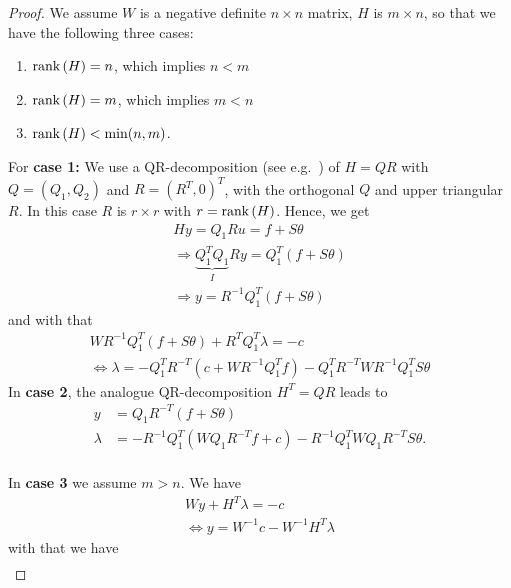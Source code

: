 \begin{proof}
We assume $W$ is a negative definite $n\times n$ matrix, $H$ is $m\times n$, so that we have the following three cases:
%
\begin{enumerate}
\item $\text{rank}\left(H\right) = n$, which implies $n<m$
\item $\text{rank}\left(H\right) = m$, which implies $m<n$
\item $\text{rank}\left(H\right) < \min(n,m)$.
\end{enumerate}
%
For {\bf{case 1:}}
%
We use a QR-decomposition (see e.g.~\cite{Golub:1996}) of $H = QR$ with $Q = (Q_1, Q_2)$ and $R = (R^T,0)^T$, with the orthogonal $Q$ and upper triangular $R$. 
%
In this case $R$ is $r\times r$ with $r=\text{rank}\left(H\right)$. 
%
Hence, we get
%
\begin{equation}\begin{aligned}
	H y = Q_1 R u = f + S\theta\\
	\Rightarrow \underbrace{Q_1^T Q_1}_I R y = Q_1^T (f+S\theta)\\
	\Rightarrow y = R^{-1}Q_1^T (f+S\theta)
\end{aligned}\end{equation}
%
and with that 
%
\begin{equation}\begin{aligned}
	W R^{-1}Q_1^T (f+S\theta) + R^TQ_1^T\lambda = -c\\
	\Leftrightarrow \lambda = -Q_1^TR^{-T}\left(c+W R^{-1}Q_1^T f\right)- Q_1^TR^{-T}W R^{-1}Q_1^T S\theta
\end{aligned}\end{equation}
%
In {\bf{case 2}}, the analogue QR-decomposition $H^T=QR$ leads to%
%
\begin{equation}\begin{aligned}
	y&=Q_1R^{-T}(f+S\theta)\\
	\lambda &= -R^{-1}Q_1^T(WQ_1R^{-T}f+c) - R^{-1}Q_1^TWQ_1R^{-T}S\theta.
\end{aligned}\end{equation}
\\[1em]
%
In {\bf{case 3}} we assume $m>n$.
%
We have
%
\begin{equation}\begin{split}
	W y + H^T \lambda = -c\\
	\Leftrightarrow y = W^{-1} c- W^{-1}H^{T}\lambda
\end{split}\end{equation}
%
with that we have
%
\begin{equation}\begin{aligned}

\end{aligned}
\end{equation}
\end{proof}
